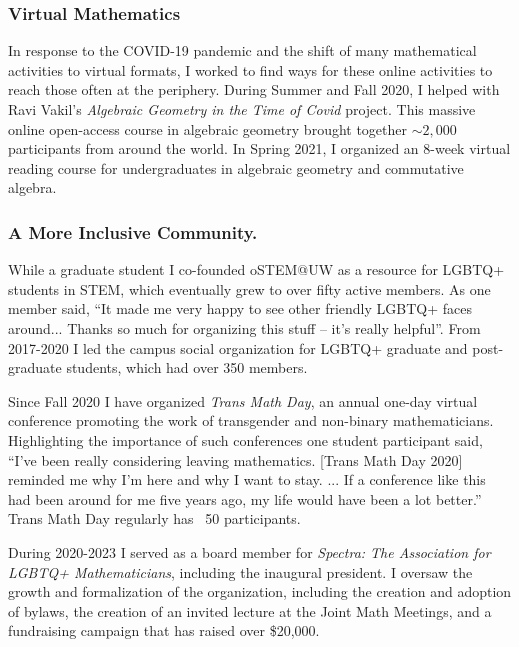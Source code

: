\documentclass[11pt,reqno]{amsart}
\theoremstyle{remark}
\begin{document}
\subsubsection{Virtual Mathematics}
In response to the COVID-19 pandemic and the shift of many mathematical activities to virtual formats, I worked to find ways for these online activities to reach those often at the periphery. During Summer and Fall 2020, I helped with Ravi Vakil's \textit{Algebraic Geometry in the Time of Covid} project. This massive online open-access course in algebraic geometry brought together $\sim2,000$ participants from around the world. In Spring 2021, I organized an 8-week virtual reading course for undergraduates in algebraic geometry and commutative algebra. 

\subsubsection{A More Inclusive Community.} 
While a graduate student I co-founded oSTEM@UW as a resource for LGBTQ+ students in STEM, which eventually grew to over fifty active members. As one member said, ``It made me very happy to see other friendly LGBTQ+ faces around... Thanks so much for organizing this stuff -- it's really helpful''. From 2017-2020 I led the campus social organization for LGBTQ+ graduate and post-graduate students, which had over 350 members. 

Since Fall 2020 I have organized \textit{Trans Math Day}, an annual one-day virtual conference promoting the work of transgender and non-binary mathematicians. Highlighting the importance of such conferences one student participant said, ``I've been really considering leaving mathematics.  [Trans Math Day 2020] reminded me why I'm here and why I want to stay. ... If a conference like this had been around for me five years ago, my life would have been a lot better.'' Trans Math Day regularly has ~50 participants. 

During 2020-2023 I served as a board member for \textit{Spectra: The Association for LGBTQ+ Mathematicians}, including the inaugural president. I oversaw the growth and formalization of the organization, including the creation and adoption of bylaws, the creation of an invited lecture at the Joint Math Meetings, and a fundraising campaign that has raised over \$20,000.


\end{document}
